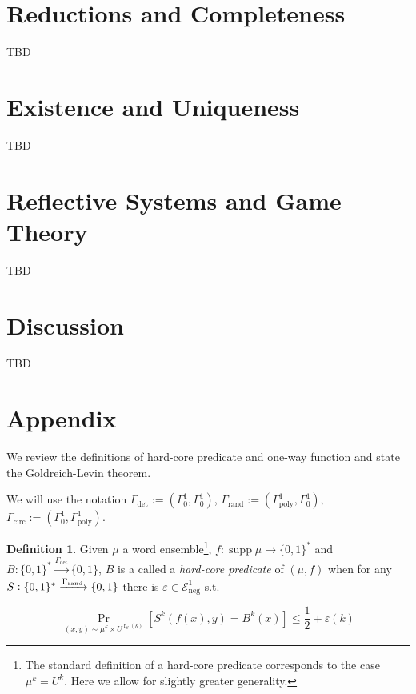 \documentclass{article}
\numberwithin{equation}{section}
\theoremstyle{definition}
\newtheorem{definition}{Definition}[section]
\theoremstyle{plain}
\newcommand{\Words}{{\{ 0, 1 \}^*}}
\newcommand{\Bool}{\{0,1\}}
\DeclareMathOperator{\Supp}{supp}
\DeclareMathOperator{\Prb}{Pr}
\DeclareMathOperator{\R}{r}
\begin{document}
\section{Reductions and Completeness}
\label{sec:reductions}

TBD

\section{Existence and Uniqueness}
\label{sec:e_and_u}

TBD

\section{Reflective Systems and Game Theory}
\label{sec:reflective}

TBD

\section{Discussion}
\label{sec:discussion}

TBD

\appendix

\section{Appendix}

We review the definitions of hard-core predicate and one-way function and state the Goldreich-Levin theorem.

We will use the notation $\Gamma_{\text{det}}:=(\Gamma_0^1,\Gamma_0^1)$, $\Gamma_{\text{rand}}:=(\Gamma_{\text{poly}}^1,\Gamma_0^1)$, ${\Gamma_{\text{circ}}:=(\Gamma_0^1,\Gamma_{\text{poly}}^1)}$.

\begin{samepage}
\begin{definition}

Given $\mu$ a word ensemble\footnote{The standard definition of a hard-core predicate corresponds to the case $\mu^k=U^k$. Here we allow for slightly greater generality.}, $f: \Supp \mu \rightarrow \Words$ and ${B: \Words \xrightarrow{\Gamma_{\text{det}}} \Bool}$, $B$ is a called a \emph{hard-core predicate} of $(\mu,f)$ when for any $S: \Words \xrightarrow{\Gamma_{\textnormal{rand}}} \Bool$ there is $\varepsilon \in \mathcal{E}_{\text{neg}}^1$ s.t. 

\begin{equation}
\Prb_{(x,y) \sim \mu^k \times U^{\R_S(k)}}[S^k(f(x),y)=B^k(x)] \leq \frac{1}{2} + \varepsilon(k)
\end{equation}

\end{definition}
\end{samepage}
\end{document}
